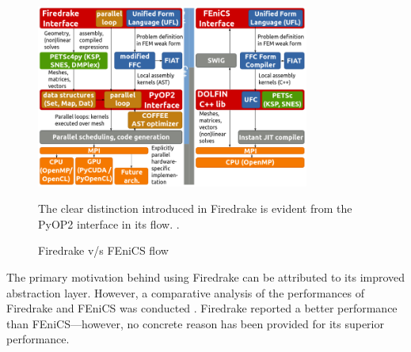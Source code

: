 \begin{figure}[th]
        \centering
        \includegraphics[width=0.8\textwidth]{figures/firedrake_toolchain_dolfin.png}
        \caption{Firedrake v/s FEniCS flow}The clear distinction introduced in Firedrake is evident from the PyOP2 interface in its flow. \cite{rathgeber2014firedrake}.
        \label{figure:parameter}
        \end{figure}

The primary motivation behind using Firedrake can be attributed to its improved abstraction layer. However, a comparative analysis of the performances of Firedrake and FEniCS was conducted \cite{rathgeber2016firedrake}. Firedrake reported a better performance than FEniCS---however, no concrete reason has been provided for its superior performance.
